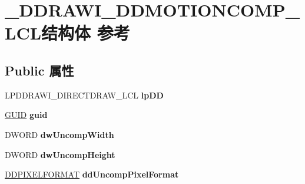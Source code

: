 \hypertarget{struct___d_d_r_a_w_i___d_d_m_o_t_i_o_n_c_o_m_p___l_c_l}{}\section{\+\_\+\+D\+D\+R\+A\+W\+I\+\_\+\+D\+D\+M\+O\+T\+I\+O\+N\+C\+O\+M\+P\+\_\+\+L\+C\+L结构体 参考}
\label{struct___d_d_r_a_w_i___d_d_m_o_t_i_o_n_c_o_m_p___l_c_l}
\subsection*{Public 属性}
\begin{DoxyCompactItemize}
\item 
\mbox{\label{struct___d_d_r_a_w_i___d_d_m_o_t_i_o_n_c_o_m_p___l_c_l_af7050a02358ea3ecb559c6bdba1dfbf0}} 
L\+P\+D\+D\+R\+A\+W\+I\+\_\+\+D\+I\+R\+E\+C\+T\+D\+R\+A\+W\+\_\+\+L\+CL {\bfseries lp\+DD}
\item 
\mbox{\label{struct___d_d_r_a_w_i___d_d_m_o_t_i_o_n_c_o_m_p___l_c_l_a768ae3f6092736c478376dff5d3933d1}} 
\hyperlink{interface_g_u_i_d}{G\+U\+ID} {\bfseries guid}
\item 
\mbox{\label{struct___d_d_r_a_w_i___d_d_m_o_t_i_o_n_c_o_m_p___l_c_l_ae057a711431480876da496e858c9b67f}} 
D\+W\+O\+RD {\bfseries dw\+Uncomp\+Width}
\item 
\mbox{\label{struct___d_d_r_a_w_i___d_d_m_o_t_i_o_n_c_o_m_p___l_c_l_a8c81d449a6c49cf34d7bd0f55e9e6d27}} 
D\+W\+O\+RD {\bfseries dw\+Uncomp\+Height}
\item 
\mbox{\label{struct___d_d_r_a_w_i___d_d_m_o_t_i_o_n_c_o_m_p___l_c_l_a912a7e47f80ca475cb67cf277a2ea2dc}} 
\hyperlink{struct___d_d_p_i_x_e_l_f_o_r_m_a_t}{D\+D\+P\+I\+X\+E\+L\+F\+O\+R\+M\+AT} {\bfseries dd\+Uncomp\+Pixel\+Format}
\item 
\mbox{\label{struct___d_d_r_a_w_i___d_d_m_o_t_i_o_n_c_o_m_p___l_c_l_a092f7f6a6b05c3dd3da4cd2ef963911d}} 

\end{DoxyCompactItemize}

